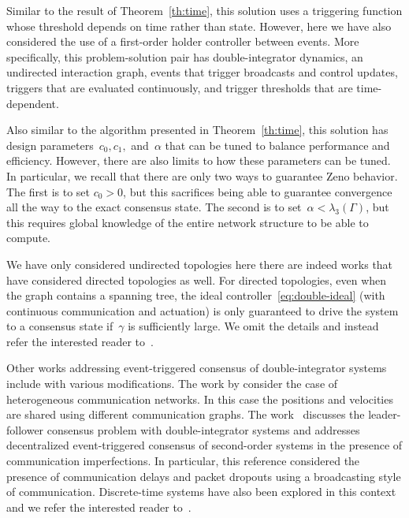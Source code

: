 \documentclass{autart}
\begin{document}
Similar to the result of Theorem~\ref{th:time}, this solution uses a
triggering function whose threshold depends on time rather than
state. However, here we have also considered the use of a first-order
holder controller between events. More specifically, this
problem-solution pair has double-integrator dynamics, an undirected
interaction graph, events that trigger broadcasts and control updates,
triggers that are evaluated continuously, and trigger thresholds that
are time-dependent.

Also similar to the algorithm presented in Theorem~\ref{th:time}, this
solution has design parameters~$c_0,c_1,$ and~$\alpha$ that can be
tuned to balance performance and efficiency. However, there are also
limits to how these parameters can be tuned. In particular, we recall
that there are only two ways to guarantee Zeno behavior. The first is
to set $c_0 > 0$, but this sacrifices being able to guarantee
convergence all the way to the exact consensus state. The second is to
set~$\alpha < \lambda_3(\Gamma)$, but this requires global knowledge
of the entire network structure to be able to compute.

We have only considered undirected topologies here there are indeed
works that have considered directed topologies as well.  For directed
topologies, even when the graph contains a spanning tree, the ideal
controller~\eqref{eq:double-ideal} (with continuous communication and
actuation) is only guaranteed to drive the system to a consensus state
if~$\gamma$ is sufficiently large. We omit the details and instead
refer the interested reader to~\citep{GSS-DVD-KHJ:13}.

Other works addressing event-triggered consensus of double-integrator
systems include \citep{HY-YS-HZ-HS:14,DX-SH:13,XY-DY:13,NM-XL-TH:15}
with various modifications. The work by \cite{DX-SH:13} consider the
case of heterogeneous communication networks. In this case the
positions and velocities are shared using different communication
graphs. %
The work~\cite{NM-XL-TH:15} discusses the leader-follower consensus
problem with double-integrator systems and \citep{EG-YC-DWC:16}
addresses decentralized event-triggered consensus of second-order
systems in the presence of communication imperfections. In particular,
this reference considered the presence of communication delays and
packet dropouts using a broadcasting style of
communication. Discrete-time systems have also been explored in this
context and we refer the interested reader
to~\citep{XC-FH:12,WZ-HP-DW-HL:17,XY-DY:13,XY-DY-SH:13}.
\end{document}
